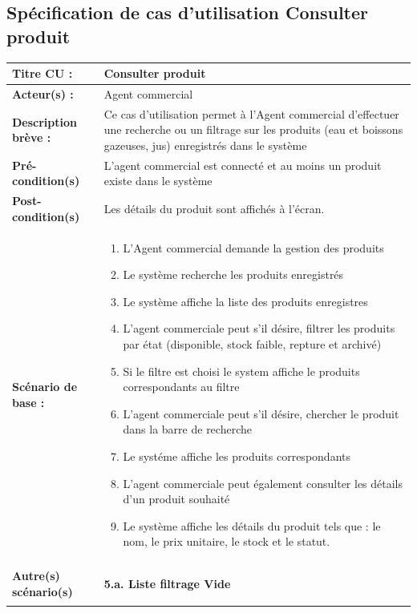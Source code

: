 \newpage
\subsection{Spécification de cas d'utilisation Consulter produit}

\begin{table}[H]
\begin{tabularx}{\textwidth}{|l|X|}
\hline
\textbf{Titre CU :} & Consulter produit \\
\hline
\textbf{Acteur(s) :} & Agent commercial \\
\hline
\textbf{Description brève :} & Ce cas d'utilisation permet à l'Agent commercial d'effectuer une recherche ou un filtrage sur les produits (eau et boissons gazeuses, jus) enregistrés dans le système \\
\hline
\textbf{Pré-condition(s)} & L'agent commercial est connecté et au moins un produit existe dans le système \\
\hline
\textbf{Post-condition(s)} & Les détails du produit sont affichés à l'écran. \\
\hline
\textbf{Scénario de base :} &
\begin{enumerate}[leftmargin=1.5em, topsep=2pt, itemsep=1pt]
  \item L'Agent commercial demande la gestion des produits
  \item Le système recherche les produits enregistrés
  \item Le système affiche la liste des produits enregistres
  \item L'agent commerciale peut s'il désire, filtrer les produits par état (disponible, stock faible, repture et archivé)
  \item Si le filtre est choisi le system affiche le produits correspondants au filtre
  \item L'agent commerciale peut s'il désire, chercher le produit dans la barre de recherche
  \item Le systéme affiche les produits correspondants
  \item L'agent commerciale peut également consulter les détails d'un produit souhaité
  \item Le système affiche les détails du produit tels que : le nom, le prix unitaire, le stock et le statut.
\end{enumerate} \\
\hline
\textbf{Autre(s) scénario(s)} &
\textbf{5.a. Liste filtrage Vide}
\begin{enumerate}[leftmargin=1.5em, topsep=2pt, itemsep=1pt]

\end{enumerate}
\end{tabularx}
\end{table}
